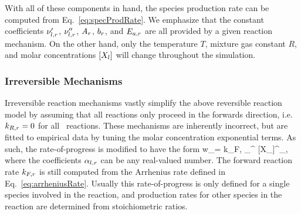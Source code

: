 With all of these components in hand, the species production rate can be computed from Eq.~\ref{eq:specProdRate}. We emphasize that the constant coefficients $\nu_{l, r}'$, $\nu_{l, r}''$, $A_{r}$, $b_{r}$, and $E_{a,r}$ are all provided by a given reaction mechanism. On the other hand, only the temperature $T$, mixture gas constant $R$, and molar concentrations $[X_{l}]$ will change throughout the simulation.


\subsubsection{Irreversible Mechanisms}

Irreversible reaction mechanisms vastly simplify the above reversible reaction model by assuming that all reactions only proceed in the forwards direction, i.e. $k_{R,r} = 0$ for all \numReacs\ reactions. These mechanisms are inherently incorrect, but are fitted to empirical data by tuning the molar concentration exponential terms. As such, the rate-of-progress is modified to have the form
\be
    w_\reacIdx = k_{F,\reacIdx} \prod_{}^{\numSpecies} [X_\speciesIdx]^{\alpha_{\speciesIdx,\reacIdx}}
\ee
where the coefficients $\alpha_{l, r}$ can be any real-valued number. The forward reaction rate $k_{F,r}$ is still computed from the Arrhenius rate defined in Eq.~\ref{eq:arrheniusRate}. Usually this rate-of-progress is only defined for a single species involved in the reaction, and production rates for other species in the reaction are determined from stoichiometric ratios.
